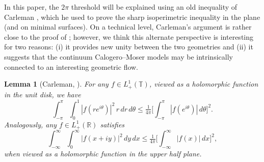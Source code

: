 \documentclass{amsart}
\numberwithin{equation}{section}
\newtheorem{lemma}[theorem]{Lemma}
\theoremstyle{definition}
\newcommand{\R}{\mathbb{R}}
\newcommand{\T}{\mathbb{T}}
\begin{document}
In this paper, the $2\pi$ threshold will be explained using an old inequality of Carleman \cite{Carleman}, which he used to prove the sharp isoperimetric inequality in the plane (and on minimal surfaces).  On a technical level, Carleman's argument is rather close to the proof of \cite[Lemma~A.1]{gerard2024calogero}; however, we think this alternate perspective is interesting for two reasons: (i) it provides new unity between the two geometries and (ii) it suggests that the continuum Calogero--Moser models may be intrinsically connected to an interesting geometric flow.


\begin{lemma}[Carleman, \cite{Carleman}]\label{L:Carleman}
For any $f \in L^1_+(\T)$, viewed as a holomorphic function in the unit disk, we have 
\begin{equation}\label{E:Carleman}
	\int_{-\pi}^\pi\int_0^1  |f(r e^{i\theta}) |^2\,r\,dr\,d\theta  \leq \tfrac{1}{4\pi} \biggl[\int_{-\pi}^\pi |f(e^{i\theta})|\,d\theta\biggr]^2.
\end{equation}
Analogously, any $f \in L^1_+(\R)$ satisfies
\begin{equation}\label{E:Carleman_R}
	\int_{-\infty}^\infty \int_0^\infty  |f(x+i y ) |^2\,dy\,dx  \leq \tfrac{1}{4\pi} \biggl[\int_{-\infty}^\infty |f(x)|\,dx\biggr]^2,
\end{equation}
when viewed as a holomorphic function in the upper half plane.
\end{lemma}
\end{document}
